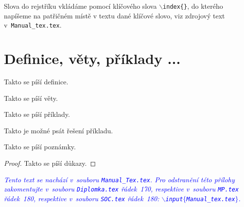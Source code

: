 

Slova do rejstříku vkládáme pomocí klíčového slova \texttt{$\backslash$index\{\}}, do kterého napíšeme na patřičném místě v textu dané klíčové slovo, viz zdrojový text v~\texttt{\cestaStyles Manual\_tex.tex}.



\section{Definice, věty, příklady ...}

\begin{definition}\label{de:definice1}
Takto se píší definice.
\end{definition}

\begin{proposition}\label{pr:veta1}
Takto se píší věty.
\end{proposition}

\begin{example}\label{ex:priklad1}
Takto se píší příklady.
\end{example}
\begin{solution}
Takto je možné psát řešení příkladu.
\end{solution}

\begin{note}
Takto se píší poznámky.
\end{note}

\begin{proof}
Takto se píší důkazy.
\end{proof}



\textcolor{blue}{\em Tento text se nachází v~souboru \texttt{\cestaStyles Manual\_Tex.tex}. Pro odstranění této přílohy zakomentujte v~souboru \texttt{Diplomka.tex} řádek~170, respektive v~souboru \texttt{MP.tex} řádek~180, respektive v~souboru \texttt{SOC.tex} řádek~180\?: \texttt{$\backslash$input$\{$\cestaStyles Manual\_tex.tex$\}$}.\/}
